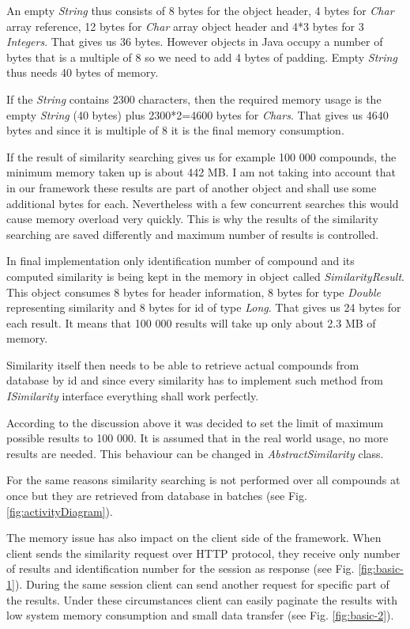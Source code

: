 \documentclass[thesis=M,english]{FITthesis}[2012/10/20]
\begin{document}
An empty \textit{String} thus consists of 8 bytes for the object header, 4 bytes for \textit{Char} array reference, 12 bytes for \textit{Char} array object header and 4*3 bytes for 3 \textit{Integers}. That gives us 36 bytes. However objects in Java occupy a number of bytes that is a multiple of 8 so we need to add 4 bytes of padding. Empty \textit{String} thus needs 40 bytes of memory.

If the \textit{String} contains 2300 characters, then the required memory usage is the empty \textit{String} (40 bytes) plus 2300*2=4600 bytes for \textit{Chars}. That gives us 4640 bytes and since it is multiple of 8 it is the final memory consumption.

If the result of similarity searching gives us for example 100 000 compounds, the minimum memory taken up is about 442 MB. I am not taking into account that in our framework these results are part of another object and shall use some additional bytes for each. Nevertheless with a few concurrent searches this would cause memory overload very quickly. This is why the results of the similarity searching are saved differently and maximum number of results is controlled.

In final implementation only identification number of compound and its computed similarity is being kept in the memory in object called \textit{SimilarityResult}. This object consumes 8 bytes for header information, 8 bytes for type \textit{Double} representing similarity and 8 bytes for id of type \textit{Long}. That gives us 24 bytes for each result. It means that 100 000 results will take up only about 2.3 MB of memory.

Similarity itself then needs to be able to retrieve actual compounds from database by id and since every similarity has to implement such method from \textit{ISimilarity} interface everything shall work perfectly.

According to the discussion above it was decided to set the limit of maximum possible results to 100 000. It is assumed that in the real world usage, no more results are needed. This behaviour can be changed in \textit{AbstractSimilarity} class.

For the same reasons similarity searching is not performed over all compounds at once but they are retrieved from database in batches (see Fig. \ref{fig:activityDiagram}).

The memory issue has also impact on the client side of the framework. When client sends the similarity request over HTTP protocol, they receive only number of results and identification number for the session as response (see Fig. \ref{fig:basic-1}). During the same session client can send another request for specific part of the results. Under these circumstances client can easily paginate the results with low system memory consumption and small data transfer (see Fig. \ref{fig:basic-2}).
\end{document}
